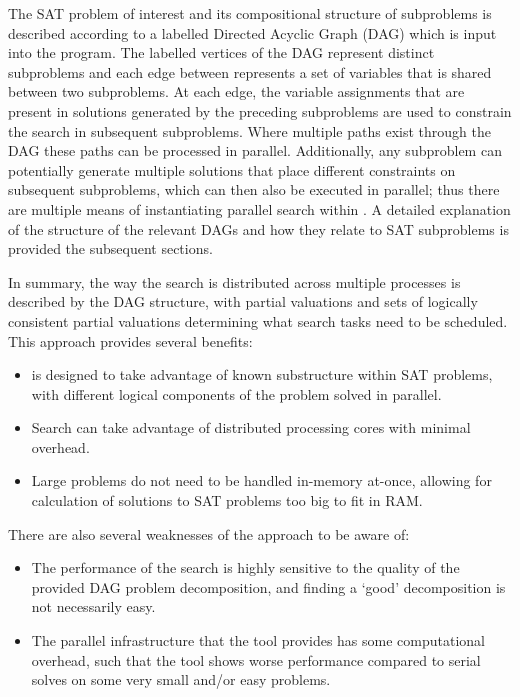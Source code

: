 \documentclass[
10pt, %
a4paper, %
oneside, %
headinclude,footinclude, %
BCOR5mm, %
]{scrartcl}
\begin{document}
The SAT problem of interest and its compositional structure of subproblems is described according to a labelled Directed Acyclic Graph (DAG) which is input into the program.
The labelled vertices of the DAG represent distinct subproblems and each edge between represents a set of variables that is shared between two subproblems.
At each edge, the variable assignments that are present in solutions generated by the preceding subproblems are used to constrain the search in subsequent subproblems.
Where multiple paths exist through the DAG these paths can be processed in parallel.
Additionally, any subproblem can potentially generate multiple solutions that place different constraints on subsequent subproblems, which can then also be executed in parallel; thus there are multiple means of instantiating parallel search within \dagster.
A detailed explanation of the structure of the relevant DAGs and how they relate to SAT subproblems is provided the subsequent sections.

In summary, the way the search is distributed across multiple processes is described by the DAG structure, with partial valuations and sets of logically consistent partial valuations determining what search tasks need to be scheduled.
This approach provides several benefits:
\begin{itemize}
\item	\dagster is designed to take advantage of known substructure within SAT problems, with different logical components of the problem solved in parallel.
\item	Search can take advantage of distributed processing cores with minimal overhead.
\item	Large problems do not need to be handled in-memory at-once, allowing for calculation of solutions to SAT problems too big to fit in RAM.
\end{itemize}
There are also several weaknesses of the approach to be aware of:
\begin{itemize}
\item	The performance of the search is highly sensitive to the quality of the provided DAG problem decomposition, and finding a `good' decomposition is not necessarily easy.
\item	The parallel infrastructure that the tool provides has some computational overhead, such that the tool shows worse performance compared to serial solves on some very small and/or easy problems.
\end{itemize}
\end{document}
